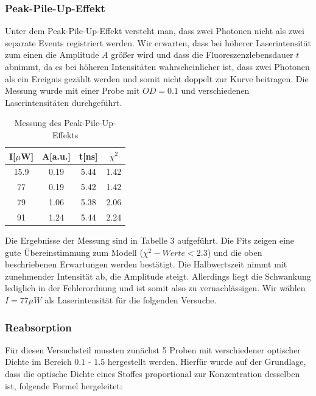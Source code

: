 \documentclass{article}
\begin{document}
\subsubsection{Peak-Pile-Up-Effekt}
Unter dem Peak-Pile-Up-Effekt versteht man, dass zwei Photonen nicht als zwei separate Events registriert werden. Wir erwarten,
dass bei höherer Laserintensität zum einen die Amplitude $A$ größer wird und dass die Fluoreszenzlebensdauer $t$ abnimmt, da es bei
höheren Intensitäten wahrscheinlicher ist, dass zwei Photonen als ein Ereignis gezählt werden und somit nicht doppelt zur Kurve beitragen.
Die Messung wurde mit einer Probe mit $OD = 0.1$ und verschiedenen Laserintensitäten durchgeführt.

\begin{table}[h]
  \centering
  \begin{tabular}{c|c|c|c}
    I[$\mu$W]      & A[a.u.]  & t[ns]             & $\chi^2$\\
    \hline
    15.9            &  0.19    & 5.44              & 1.42    \\
    77              &  0.19    & 5.42              & 1.42    \\
    79              &  1.06    & 5.38              & 2.06    \\
    91              &  1.24    & 5.44              & 2.24    \\
  \end{tabular}
  \caption{Messung des Peak-Pile-Up-Effekts}
\end{table}


Die Ergebnisse der Messung sind in Tabelle 3 aufgeführt. Die Fits zeigen eine gute Übereinstimmung zum Modell ($\chi^2-Werte < 2.3$)
und die oben beschriebenen Erwartungen werden bestätigt. Die Halbwertszeit nimmt mit zunehmender Intensität ab, die Amplitude steigt.
Allerdings liegt die Schwankung lediglich in der Fehlerordnung und ist somit also zu vernachlässigen. Wir wählen $I = 77 \mu W$ als
Laserintensität für die folgenden Versuche.



\subsubsection{Reabsorption}
Für diesen Versuchsteil mussten zunächst 5 Proben mit verschiedener optischer Dichte im Bereich
$0.1$ - $1.5$ hergestellt werden. Hierfür wurde auf der Grundlage, dass die optische Dichte eines Stoffes
proportional zur Konzentration desselben ist, folgende Formel hergeleitet:
\end{document}
